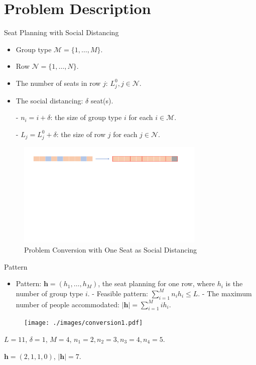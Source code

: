 
\section{Problem Description}
    \frame{\sectionpage}
\begin{frame}{Seat Planning with Social Distancing}
  \begin{itemize}  
    \item Group type $\mathcal{M} = \{1, \ldots, M\}$.
    \item Row $\mathcal{N} = \{1, \ldots, N\}$.
    \item The number of seats in row $j$: $L_j^{0}, j \in \mathcal{N}$.
    \item The social distancing: $\delta$ seat(s).
    \item[-] $n_i = i + \delta$: the size of group type $i$ for each $i \in \mathcal{M}$.
    \item[-] $L_j = L_j^{0} + \delta$: the size of row $j$ for each $j \in \mathcal{N}$.
    \end{itemize}
    
    \begin{figure}[ht]
      \centering
      \includegraphics[width = 0.8\textwidth]{./images/dummy_seat.pdf}
      \caption{Problem Conversion with One Seat as Social Distancing}
  \end{figure}
  \end{frame}

  \begin{frame}{Pattern}
    \begin{itemize}
      \item Pattern: $\bm{h} = (h_1, \ldots, h_M)$, the seat planning for one row, where $h_i$ is the number of group type $i$.
      - Feasible pattern: $\sum_{i=1}^{M} n_i h_i \leq L$.
      - The maximum number of people accommodated: $|\bm{h}| = \sum_{i =1}^{M} i h_i$.
    \end{itemize}
    
    \begin{figure}[ht]
      \centering
      \texttt{[image: ./images/conversion1.pdf]}
    \end{figure}
    \centering
    $L = 11$, $\delta =1$, $M =4$, $n_1 = 2, n_2 = 3, n_3 = 4, n_4 = 5$. 

    $\bm{h} = (2, 1, 1, 0)$, $|\bm{h}| = 7$.
  \end{frame}

